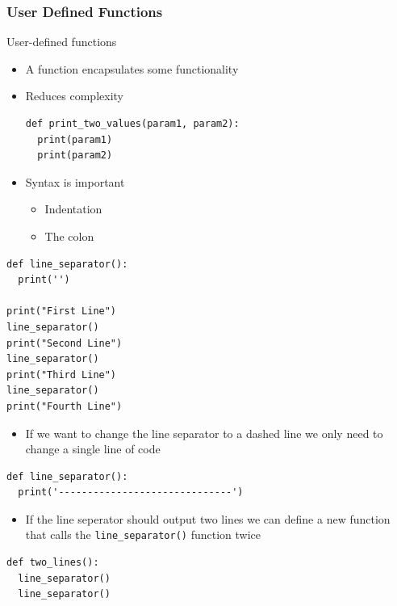 \documentclass[10pt, a4paper]{beamer} %
\begin{document}
\begin{frame}\frametitle{User Defined Functions}
  \begin{block}{User-defined functions}
    \begin{itemize}
      \item A function encapsulates some functionality
      \item Reduces complexity
            \begin{lstlisting}
def print_two_values(param1, param2):
  print(param1)
  print(param2)
    \end{lstlisting}
      \item Syntax is important
            \begin{itemize}
              \item Indentation
              \item The colon
            \end{itemize}
    \end{itemize}
  \end{block}
  \framebreak
  \begin{examples}
    \begin{lstlisting}
def line_separator():
  print('')

print("First Line")
line_separator()
print("Second Line")
line_separator()
print("Third Line")
line_separator()
print("Fourth Line")
\end{lstlisting}
  \end{examples}
  \begin{itemize}
    \item If we want to change the line separator to a dashed line we only need to change a single line of code
  \end{itemize}
  \begin{lstlisting}
def line_separator():
  print('------------------------------')
\end{lstlisting}


  \framebreak

  \begin{examples}
    \begin{itemize}
      \item If the line seperator should output two lines we can define a new function that calls the \lstinline!line_separator()! function twice
    \end{itemize}
    \begin{lstlisting}
def two_lines():
  line_separator()
  line_separator()


\end{lstlisting}
\end{examples}
\end{frame}
\end{document}
